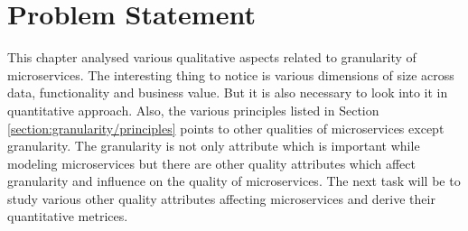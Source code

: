 \section{Problem Statement}\label{section:granularity/problem_statement}
This chapter analysed various qualitative aspects related to granularity of microservices. The interesting thing to notice is various dimensions of size across data, functionality and business value. But it is also necessary to look into it in quantitative approach. Also, the various principles listed in Section \ref{section:granularity/principles} points to other qualities of microservices except granularity. The granularity is not only attribute which is important while modeling microservices but there are other quality attributes which affect granularity and influence on the quality of microservices. The next task will be to study various other quality attributes affecting microservices and derive their quantitative metrices.

 